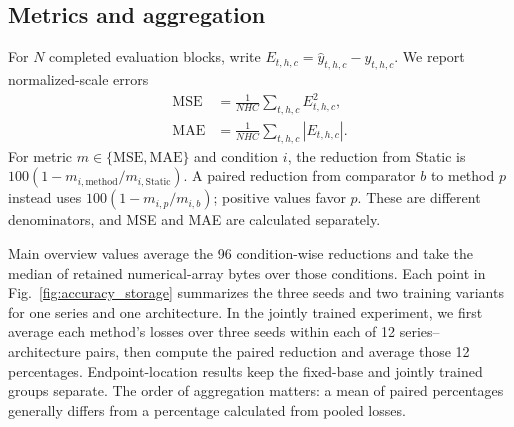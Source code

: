 \subsection{Metrics and aggregation}
For $N$ completed evaluation blocks, write $E_{t,h,c}=\widehat y_{t,h,c}-y_{t,h,c}$. We report normalized-scale errors
\begin{equation}
 \begin{aligned}
 \operatorname{MSE}&=\frac{1}{NHC}\sum_{t,h,c}E_{t,h,c}^{2},\\
 \operatorname{MAE}&=\frac{1}{NHC}\sum_{t,h,c}|E_{t,h,c}|.
 \end{aligned}
 \label{eq:eval_metrics}
\end{equation}
For metric $m\in\{\mathrm{MSE},\mathrm{MAE}\}$ and condition $i$, the reduction from Static is $100(1-m_{i,\mathrm{method}}/m_{i,\mathrm{Static}})$. A paired reduction from comparator $b$ to method $p$ instead uses $100(1-m_{i,p}/m_{i,b})$; positive values favor $p$. These are different denominators, and MSE and MAE are calculated separately.

Main overview values average the 96 condition-wise reductions and take the median of retained numerical-array bytes over those conditions. Each point in Fig.~\ref{fig:accuracy_storage} summarizes the three seeds and two training variants for one series and one architecture. In the jointly trained experiment, we first average each method's losses over three seeds within each of 12 series--architecture pairs, then compute the paired reduction and average those 12 percentages. Endpoint-location results keep the fixed-base and jointly trained groups separate. The order of aggregation matters: a mean of paired percentages generally differs from a percentage calculated from pooled losses.

